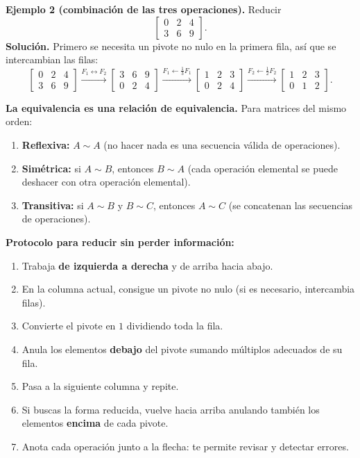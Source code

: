 \documentclass[12pt, letterpaper]{article}
\newcommand{\mwmat}[1]{\ensuremath{\begin{bmatrix}#1\end{bmatrix}}}
\begin{document}
\begin{cuadrosolucion}
  \small
  \textbf{Ejemplo 2 (combinación de las tres operaciones).} Reducir
  \[
    \mwmat{0&2&4\\3&6&9}.
  \]
  \textbf{Solución.} Primero se necesita un pivote no nulo en la primera
  fila, así que se intercambian las filas:
  \[
    \mwmat{0&2&4\\3&6&9}
    \xrightarrow{F_1\leftrightarrow F_2}
    \mwmat{3&6&9\\0&2&4}
    \xrightarrow{F_1\leftarrow \frac13F_1}
    \mwmat{1&2&3\\0&2&4}
    \xrightarrow{F_2\leftarrow \frac12F_2}
    \mwmat{1&2&3\\0&1&2}.
  \]
\end{cuadrosolucion}

\begin{cuadroteoria}
  \small
  \textbf{La equivalencia es una relación de equivalencia.} Para matrices
  del mismo orden:
  \begin{enumerate}[leftmargin=1.4em, nosep]
    \item \textbf{Reflexiva:} $A\sim A$ (no hacer nada es una secuencia
          válida de operaciones).
    \item \textbf{Simétrica:} si $A\sim B$, entonces $B\sim A$ (cada
          operación elemental se puede deshacer con otra operación
          elemental).
    \item \textbf{Transitiva:} si $A\sim B$ y $B\sim C$, entonces
          $A\sim C$ (se concatenan las secuencias de operaciones).
  \end{enumerate}
\end{cuadroteoria}

\begin{cuadropasos}
  \small
  \textbf{Protocolo para reducir sin perder información:}
  \begin{enumerate}[leftmargin=1.4em, nosep]
    \item Trabaja \textbf{de izquierda a derecha} y de arriba hacia abajo.
    \item En la columna actual, consigue un pivote no nulo (si es necesario,
          intercambia filas).
    \item Convierte el pivote en $1$ dividiendo toda la fila.
    \item Anula los elementos \textbf{debajo} del pivote sumando múltiplos
          adecuados de su fila.
    \item Pasa a la siguiente columna y repite.
    \item Si buscas la forma reducida, vuelve hacia arriba anulando también
          los elementos \textbf{encima} de cada pivote.
    \item Anota cada operación junto a la flecha: te permite revisar y
          detectar errores.
  \end{enumerate}
\end{cuadropasos}
\end{document}
